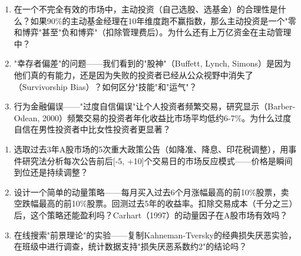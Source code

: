 \documentclass[a4paper,11pt]{ctexbook}
\begin{document}
{\begin{lessonsummary}
\begin{discuss}
\begin{enumerate}
  \item 在一个不完全有效的市场中，主动投资（自己选股、选基金）的合理性是什么？如果90\%的主动基金经理在10年维度跑不赢指数，那么主动投资是一个"零和博弈"甚至"负和博弈"（扣除管理费后）。为什么还有上万亿资金在主动管理中？
  \item "幸存者偏差"的问题——我们看到的"股神"（Buffett, Lynch, Simons）是因为他们真的有能力，还是因为失败的投资者已经从公众视野中消失了（Survivorship Bias）？如何区分"技能"和"运气"？
  \item 行为金融偏误——"过度自信偏误"让个人投资者频繁交易，研究显示（Barber-Odean, 2000）频繁交易的投资者年化收益比市场平均低约6-7\%。为什么过度自信在男性投资者中比女性投资者更显著？
\end{enumerate}
\end{discuss}

\begin{exercises}
\begin{enumerate}
  \item 选取过去3年A股市场的5次重大政策公告（如降准、降息、印花税调整），用事件研究法分析每次公告前后[-5, +10]个交易日的市场反应模式——价格是瞬间到位还是持续调整？
  \item 设计一个简单的动量策略——每月买入过去6个月涨幅最高的前10\%股票，卖空跌幅最高的前10\%股票。回测过去5年的收益率。扣除交易成本（千分之三）后，这个策略还能盈利吗？Carhart（1997）的动量因子在A股市场有效吗？
  \item 在线搜索"前景理论"的实验——复制Kahneman-Tversky的经典损失厌恶实验，在班级中进行调查，统计数据支持"损失厌恶系数约2"的结论吗？
\end{enumerate}
\end{exercises}



\end{lessonsummary}}
\end{document}
